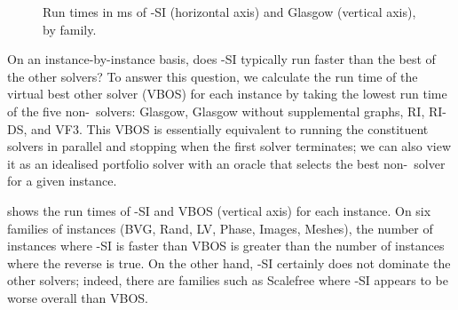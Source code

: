 \begin{figure}[htb]
    \caption{Run times in ms of \McSplit-SI (horizontal axis) and Glasgow (vertical axis), by family.}
    \label{figure:mcsplitsi-scatter-by-family}
\end{figure}

On an instance-by-instance basis, does \McSplit-SI typically run faster than
the best of the other solvers? To answer this question, we calculate the run
time of the virtual best other solver (VBOS) for each instance
by taking the lowest run time
of the five non-\McSplit\ solvers: Glasgow, Glasgow without supplemental graphs, RI, RI-DS, and VF3.
This VBOS is essentially equivalent to running the constituent solvers in parallel
and stopping when the first solver terminates; we can also view it
as an idealised portfolio solver with an oracle that selects
the best non-\McSplit\ solver for a given instance.

 shows the run times of \McSplit-SI
and VBOS (vertical axis) for each instance.  On six families
of instances (BVG, Rand, LV, Phase, Images, Meshes), the number
of instances where \McSplit-SI is faster than VBOS is greater than the number of instances where
the reverse is true. 
On the other hand, \McSplit-SI certainly does not dominate the other solvers;
indeed, there are families such as Scalefree where \McSplit-SI appears to be worse overall than VBOS.

